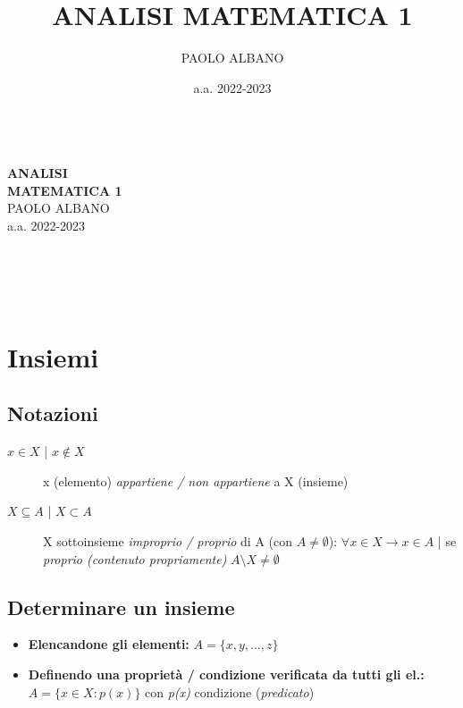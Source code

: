 \documentclass[10pt, oneside]{book}
\title{ANALISI MATEMATICA 1}
\author{PAOLO ALBANO}
\date{a.a. 2022-2023}
\theoremstyle{plain}
\begin{document}
\makeatletter
\begin{titlepage}
\vspace{-2.1cm}
\hspace{0cm}
\vfill
\, \\\larger[20]\textsf{\textbf{ANALISI \\MATEMATICA 1}}
\\\smaller[2]PAOLO ALBANO
\\a.a. 2022-2023
\\~\\ \larger[20]\,\,
\\~\\ \,\,

\vfill
\hspace{0cm}
\end{titlepage}
\makeatother

\tableofcontents
\newpage

\chapter{Insiemi}

\section{Notazioni}

\begin{description}
\item[\boldmath $x \in X$  | $x \notin X$] x (elemento) \textit{appartiene / non appartiene} a X (insieme)
\item[\boldmath $X \subseteq A$  |  $X \subset A$] X sottoinsieme \textit{improprio / proprio} di A (con $A \neq \emptyset $): $\forall x \in X \rightarrow x \in A$ | se \textit{proprio (contenuto propriamente)} $A \setminus X \neq \emptyset $
\end{description}

\section{Determinare un insieme}
\begin{itemize}[label= $\ast$]
\item \textbf{Elencandone gli elementi:} $A = \{x,y,...,z\}$
\item \textbf{Definendo una proprietà / condizione verificata da tutti gli el.:} \newline $A = \{x \in X : p(x)\}$ con \textit{p(x)} condizione (\textit{predicato})
\end{itemize}
\end{document}

